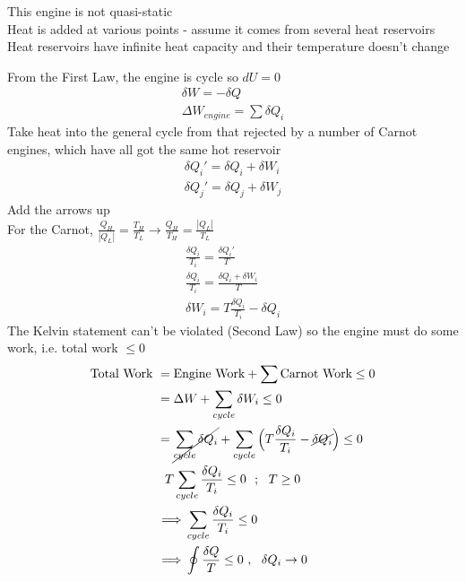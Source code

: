 \documentclass[a4paper, 11pt, normalem]{report}
\begin{document}
This engine is not quasi-static \\
Heat is added at various points - assume it comes from several heat reservoirs \\
Heat reservoirs have infinite heat capacity and their temperature doesn't change

From the First Law, the engine is cycle so $dU = 0$
\begin{gather*}
    \delta W = -\delta Q \\
    \Delta W_{engine} = \sum \delta Q_i
\end{gather*}
Take heat into the general cycle from that rejected by a number of Carnot engines, which have all got the same hot reservoir
\begin{gather*}
    \delta Q_{i}' = \delta Q_i + \delta W_i \\
    \delta Q_{j}' = \delta Q_j + \delta W_j
\end{gather*}
Add the arrows up \\
 For the Carnot, $\frac{Q_H}{|Q_L|} = \frac{T_H}{T_L} \to \frac{Q_H}{T_H} = \frac{|Q_L|}{T_L}$
 \begin{gather*}
     \frac{\delta Q_i}{T_i} = \frac{\delta Q_{i}'}{T} \\
     \frac{\delta Q_i}{T_i} = \frac{\delta Q_i + \delta W_i}{T} \\
     \delta W_i = T\frac{\delta Q_i}{T_i} - \delta Q_i
 \end{gather*}
The Kelvin statement can't be violated (Second Law) so the engine must do some work, i.e. total work $\leq 0$
\begin{gather*}
    \begin{aligned}
        \text{Total Work } &= \text{Engine Work} + \sum \text{Carnot Work} \leq 0 \\
        &= \Delta W + \sum_{cycle} \delta W_i \leq 0 \\
        &= \cancel{\sum_{cycle} \delta Q_i} + \sum_{cycle} \Big(T\frac{\delta Q_i}{T_i} - \cancel{\delta Q_i} \Big) \leq 0
    \end{aligned} \\
    T\sum_{cycle} \frac{\delta Q_i}{T_i} \leq 0 ~~;~~ T \geq 0 \\
    \begin{aligned}
        \implies & \sum_{cycle} \frac{\delta Q_i}{T_i} \leq 0 \\
        \implies & \oint \frac{\delta Q}{T} \leq 0 ~,~~ \delta Q_i \to 0
    \end{aligned}
\end{gather*}
\end{document}
